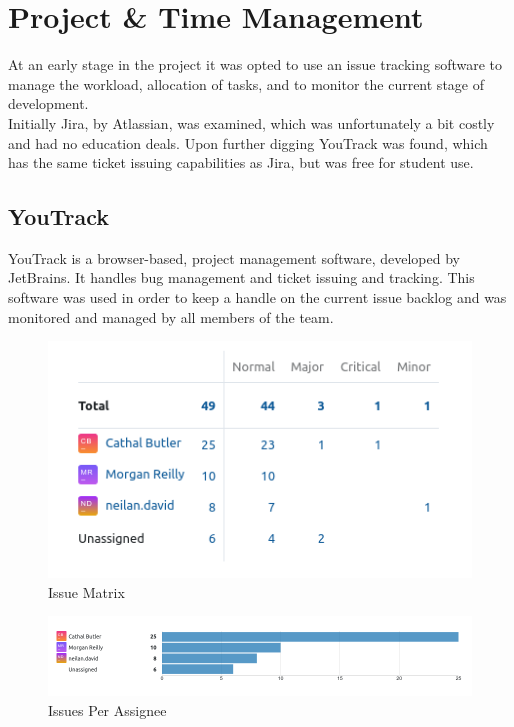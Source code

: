 \section{Project \& Time Management}
At an early stage in the project it was opted to use an issue tracking software to manage the workload, allocation of tasks, and to monitor the current stage of development.
\\ Initially Jira, by Atlassian, was examined, which was unfortunately a bit costly and had no education deals. Upon further digging YouTrack was found, which has the same ticket issuing capabilities as Jira, but was free for student use.
\subsection{YouTrack}
YouTrack is a browser-based, project management software, developed by JetBrains. It handles bug management and ticket issuing and tracking. This software was used in order to keep a handle on the current issue backlog and was monitored and managed by all members of the team. 

\begin{figure}[h!]
    \caption{Issue Matrix}
    \label{image:issuesMatrix}
    \centering
    \includegraphics[width=1.0\textwidth]{images/IssuesMatrix.png}
\end{figure}

\begin{figure}[h!]
    \caption{Issues Per Assignee}
    \label{image:IPA}
    \centering
    \includegraphics[width=1.0\textwidth]{images/IssuesPerAssignee.png}
\end{figure}

